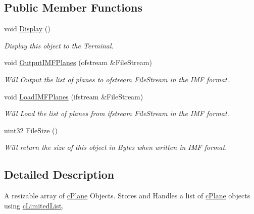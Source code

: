 \subsection*{Public Member Functions}
\begin{DoxyCompactItemize}
\item 
\hypertarget{classc_plane_list_aa59eb08cabf77a8556a968164078548a}{
void \hyperlink{classc_plane_list_aa59eb08cabf77a8556a968164078548a}{Display} ()}
\label{classc_plane_list_aa59eb08cabf77a8556a968164078548a}

\begin{DoxyCompactList}\small\item\em Display this object to the Terminal. \end{DoxyCompactList}\item 
\hypertarget{classc_plane_list_a4ab2d73d6d19172d102ae6b567838f40}{
void \hyperlink{classc_plane_list_a4ab2d73d6d19172d102ae6b567838f40}{OutputIMFPlanes} (ofstream \&FileStream)}
\label{classc_plane_list_a4ab2d73d6d19172d102ae6b567838f40}

\begin{DoxyCompactList}\small\item\em Will Output the list of planes to ofstream FileStream in the IMF format. \end{DoxyCompactList}\item 
\hypertarget{classc_plane_list_aaef4989b858a7f403b23acc209bb70d9}{
void \hyperlink{classc_plane_list_aaef4989b858a7f403b23acc209bb70d9}{LoadIMFPlanes} (ifstream \&FileStream)}
\label{classc_plane_list_aaef4989b858a7f403b23acc209bb70d9}

\begin{DoxyCompactList}\small\item\em Will Load the list of planes from ifstream FileStream in the IMF format. \end{DoxyCompactList}\item 
\hypertarget{classc_plane_list_a7789059ebbee4e08469ee870ca63b56c}{
uint32 \hyperlink{classc_plane_list_a7789059ebbee4e08469ee870ca63b56c}{FileSize} ()}
\label{classc_plane_list_a7789059ebbee4e08469ee870ca63b56c}

\begin{DoxyCompactList}\small\item\em Will return the size of this object in Bytes when written in IMF format. \end{DoxyCompactList}\end{DoxyCompactItemize}


\subsection{Detailed Description}
A resizable array of \hyperlink{classc_plane}{cPlane} Objects. Stores and Handles a list of \hyperlink{classc_plane}{cPlane} objects using \hyperlink{classc_limited_list}{cLimitedList}. 